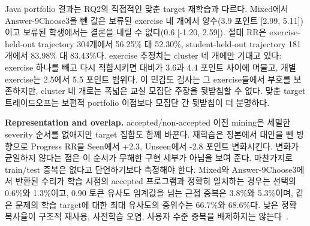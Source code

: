 \documentclass[10pt,conference]{IEEEtran}
\begin{document}
Java portfolio 결과는 RQ2의 직접적인 맞춘 target 재학습과 다르다. Mixed에서 Answer-9Choose3을 뺀 값은 보류된 exercise 네 개에서 양수(3.9 포인트 [2.99, 5.11])이고 보류된 학생에서는 결론을 내릴 수 없다(0.6 [-1.20, 2.59]). 절대 RR은 exercise-held-out trajectory 304개에서 56.25\% 대 52.30\%, student-held-out trajectory 181개에서 83.98\% 대 83.43\%다. exercise 추정치는 cluster 네 개에만 기대고 있다: exercise 하나를 빼고 다시 적합시키면 대비가 3.6과 4.4 포인트 사이에 머물고, 개별 exercise는 2.5에서 5.5 포인트 범위다. 이 민감도 검사는 그 exercise들에서 부호를 보존하지만, cluster 네 개로는 폭넓은 교실 모집단 주장을 뒷받침할 수 없다. 맞춘 target 트레이드오프는 보편적 portfolio 이점보다 모집단 간 뒷받침이 더 분명하다.

\noindent\textbf{Representation and overlap.} accepted/non-accepted 이진 mining은 세밀한 severity 순서를 없애지만 target 집합도 함께 바꾼다. 재학습은 정본에서 대안을 뺀 방향으로 Progress RR을 Seen에서 +2.3, Unseen에서 -2.8 포인트 변화시킨다. 변화가 균일하지 않다는 점은 이 순서가 무해한 구현 세부가 아님을 보여 준다. 마찬가지로 train/test 중복은 없다고 단언하기보다 측정해야 한다. Mixed와 Answer-9Choose3에서 반환된 수리가 학습 시점의 accepted 프로그램과 정확히 일치하는 경우는 선택의 0.6\%와 1.3\%이고, 0.90 토큰 유사도 임계값을 넘는 근접 중복은 3.8\%와 5.3\%이며, 같은 문제의 학습 target에 대한 최대 유사도의 중위수는 66.7\%와 68.6\%다. 낮은 정확 복사율이 구조적 재사용, 사전학습 오염, 사용자 수준 중복을 배제하지는 않는다~\cite{allamanis2019adverse}.
\end{document}
